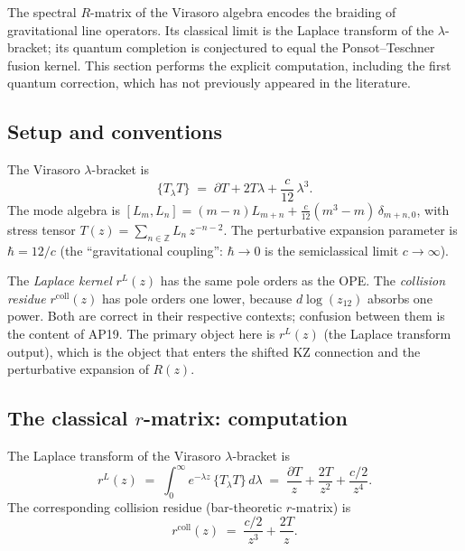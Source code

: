 \documentclass[11pt]{article}
\newcommand{\Z}{\mathbb{Z}}
\begin{document}
The spectral $R$-matrix of the Virasoro algebra encodes the
braiding of gravitational line operators.  Its classical limit is
the Laplace transform of the $\lambda$-bracket; its quantum
completion is conjectured to equal the Ponsot--Teschner fusion
kernel.  This section performs the explicit computation,
including the first quantum correction, which has not previously
appeared in the literature.

\subsection{Setup and conventions}

The Virasoro $\lambda$-bracket is
\begin{equation}\label{eq:vir-lambda-R}
\{T{}_\lambda T\}
\;=\;
\partial T + 2T\lambda + \frac{c}{12}\,\lambda^3.
\end{equation}
The mode algebra is $[L_m, L_n] = (m-n)L_{m+n} +
\frac{c}{12}(m^3 - m)\,\delta_{m+n,0}$, with stress tensor
$T(z) = \sum_{n \in \Z} L_n\, z^{-n-2}$.  The perturbative
expansion parameter is $\hbar = 12/c$ (the ``gravitational
coupling'': $\hbar \to 0$ is the semiclassical limit $c \to \infty$).

\begin{warning}
The \emph{Laplace kernel} $r^L(z)$ has the same pole orders as the
OPE.  The \emph{collision residue} $r^{\mathrm{coll}}(z)$ has pole
orders one lower, because $d\log(z_{12})$ absorbs one power.  Both
are correct in their respective contexts; confusion between them is
the content of AP19.  The primary object here is
$r^L(z)$ (the Laplace transform output), which is the object that
enters the shifted KZ connection and the perturbative expansion of
$R(z)$.
\end{warning}

\subsection{The classical $r$-matrix: computation}

\begin{proposition}
\label{prop:vir-laplace-R}
The Laplace transform of the Virasoro $\lambda$-bracket is
\begin{equation}\label{eq:vir-rL-R}
r^L(z)
\;=\;
\int_0^\infty e^{-\lambda z}\,\{T{}_\lambda T\}\,d\lambda
\;=\;
\frac{\partial T}{z}
+ \frac{2T}{z^2}
+ \frac{c/2}{z^4}.
\end{equation}
The corresponding collision residue (bar-theoretic $r$-matrix) is
\begin{equation}\label{eq:vir-rcoll-R}
r^{\mathrm{coll}}(z)
\;=\;
\frac{c/2}{z^3}
+ \frac{2T}{z}.
\end{equation}
\end{proposition}
\end{document}
